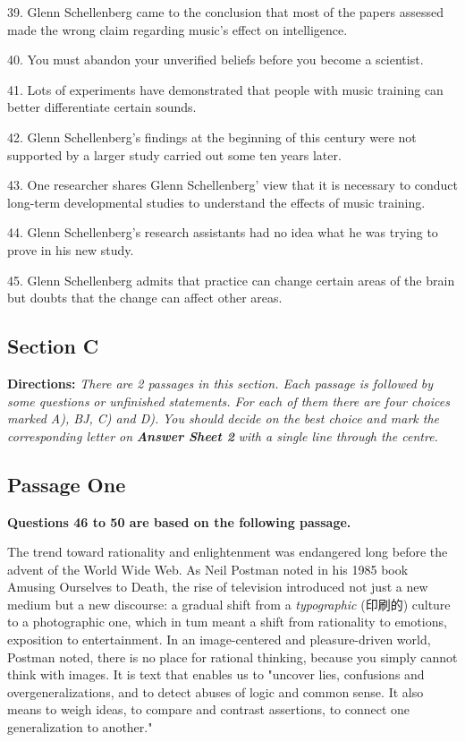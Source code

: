 \documentclass[UTF8,11pt]{ctexart}
\begin{document}
39. Glenn Schellenberg came to the conclusion that most of the papers assessed made the wrong claim regarding music's effect on intelligence.


40. You must abandon your unverified beliefs before you become a scientist.


41. Lots of experiments have demonstrated that people with music training can better differentiate certain sounds.


42. Glenn Schellenberg's findings at the beginning of this century were not supported by a larger study carried out some ten years later.


43. One researcher shares Glenn Schellenberg' view that it is necessary to conduct long-term developmental studies to understand the effects of music training.


44. Glenn Schellenberg's research assistants had no idea what he was trying to prove in his new study.


45. Glenn Schellenberg admits that practice can change certain areas of the brain but doubts that the change can affect other areas.


\subsection*{\textbf{Section C}}


\textbf{Directions: }\textit{There are 2 passages in this section. Each passage is followed by some questions} \textit{or unfinished statements. For each of them there are four choices marked A), BJ, C) and D).} \textit{You should decide on the best choice and mark the corresponding letter on }\textbf{\textit{Answer Sheet 2}} \textit{with a single line through the centre.}


\subsection*{\textbf{Passage One}}


\textbf{Questions 46 to 50 are based on the following passage.}


The trend toward rationality and enlightenment was endangered long before the advent of the World Wide Web. As Neil Postman noted in his 1985 book Amusing Ourselves to Death, the rise of television introduced not just a new medium but a new discourse: a gradual shift from a \textit{typographic }(印刷的) culture to a photographic one, which in tum meant a shift from rationality to emotions, exposition to entertainment. In an image-centered and pleasure-driven world, Postman noted, there is no place for rational thinking, because you simply cannot think with images. It is text that enables us to "uncover lies, confusions and overgeneralizations, and to detect abuses of logic and common sense. It also means to weigh ideas, to compare and contrast assertions, to connect one generalization to another."
\end{document}
